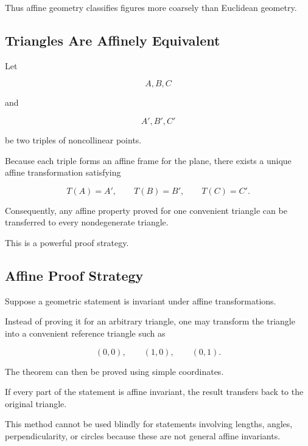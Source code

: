 Thus affine geometry classifies figures more coarsely than Euclidean
geometry.

\subsection{Triangles Are Affinely Equivalent}
\label{subsec:triangles-affinely-equivalent}

Let

\[ A,B,C \]

and

\[ A',B',C' \]

be two triples of noncollinear points.

Because each triple forms an affine frame for the plane, there exists a
unique affine transformation satisfying

\[
T(A)=A',\qquad
T(B)=B',\qquad
T(C)=C'.
\]

Consequently, any affine property proved for one convenient triangle can be
transferred to every nondegenerate triangle.

This is a powerful proof strategy.

\subsection{Affine Proof Strategy}
\label{subsec:affine-proof-strategy}

Suppose a geometric statement is invariant under affine transformations.

Instead of proving it for an arbitrary triangle, one may transform the
triangle into a convenient reference triangle such as

\[
(0,0),\qquad
(1,0),\qquad
(0,1).
\]

The theorem can then be proved using simple coordinates.

If every part of the statement is affine invariant, the result transfers
back to the original triangle.

\begin{warningbox}
This method cannot be used blindly for statements involving lengths, angles,
perpendicularity, or circles because these are not general affine
invariants.
\end{warningbox}

